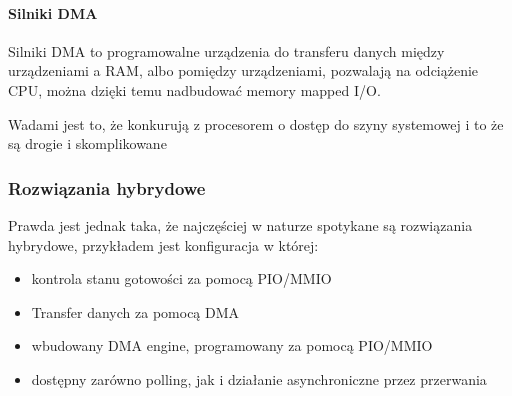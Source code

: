\paragraph{Silniki DMA}
Silniki DMA to programowalne urządzenia do transferu danych między urządzeniami a RAM, albo pomiędzy urządzeniami, pozwalają na odciążenie CPU, można dzięki temu nadbudować memory mapped I/O.

Wadami jest to, że konkurują z procesorem o dostęp do szyny systemowej i to że są drogie i skomplikowane

\subsubsection{Rozwiązania hybrydowe}
Prawda jest jednak taka, że najczęściej w naturze spotykane są rozwiązania hybrydowe, przykładem jest konfiguracja w której:
\begin{itemize}
    \item kontrola stanu gotowości za pomocą PIO/MMIO
    \item Transfer danych za pomocą DMA
    \item wbudowany DMA engine, programowany za pomocą PIO/MMIO
    \item dostępny zarówno polling, jak i działanie asynchroniczne przez przerwania
\end{itemize}
